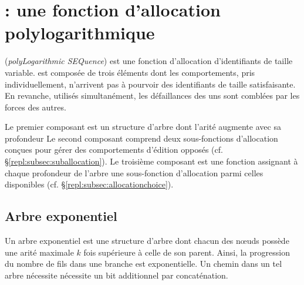
\section{\LSEQ : une fonction d'allocation polylogarithmique}
\label{repl:sec:proposal}

\LSEQ (\emph{polyLogarithmic SEQuence}) est une fonction d'allocation
d'identifiants de taille variable.
\LSEQ est composée de trois éléments dont les comportements, pris
individuellement, n'arrivent pas à pourvoir des identifiants de taille
satisfaisante. En revanche, utilisés simultanément, les défaillances des uns
sont comblées par les forces des autres.

Le premier composant est un structure d'arbre dont l'arité augmente avec sa
profondeur %
Le second composant comprend deux sous-fonctions d'allocation conçues pour gérer
des comportements d'édition opposés (cf. §\ref{repl:subsec:suballocation}). %
Le troisième composant est une fonction assignant à chaque profondeur de l'arbre
une sous-fonction d'allocation parmi celles disponibles
(cf. §\ref{repl:subsec:allocationchoice}). %

\subsection{Arbre exponentiel}
\label{repl:subsec:exponentialtree}

Un arbre exponentiel est une structure d'arbre dont chacun des nœuds possède une
arité maximale $k$ fois supérieure à celle de son parent. Ainsi, la progression
du nombre de fils dans une branche est exponentielle. Un chemin dans un tel
arbre nécessite nécessite un bit additionnel par concaténation.

